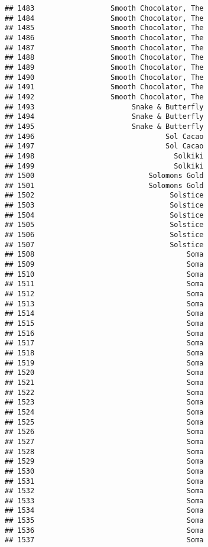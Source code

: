 \documentclass[
]{article}
\begin{document}
\begin{verbatim}
## 1483                  Smooth Chocolator, The
## 1484                  Smooth Chocolator, The
## 1485                  Smooth Chocolator, The
## 1486                  Smooth Chocolator, The
## 1487                  Smooth Chocolator, The
## 1488                  Smooth Chocolator, The
## 1489                  Smooth Chocolator, The
## 1490                  Smooth Chocolator, The
## 1491                  Smooth Chocolator, The
## 1492                  Smooth Chocolator, The
## 1493                       Snake & Butterfly
## 1494                       Snake & Butterfly
## 1495                       Snake & Butterfly
## 1496                               Sol Cacao
## 1497                               Sol Cacao
## 1498                                 Solkiki
## 1499                                 Solkiki
## 1500                           Solomons Gold
## 1501                           Solomons Gold
## 1502                                Solstice
## 1503                                Solstice
## 1504                                Solstice
## 1505                                Solstice
## 1506                                Solstice
## 1507                                Solstice
## 1508                                    Soma
## 1509                                    Soma
## 1510                                    Soma
## 1511                                    Soma
## 1512                                    Soma
## 1513                                    Soma
## 1514                                    Soma
## 1515                                    Soma
## 1516                                    Soma
## 1517                                    Soma
## 1518                                    Soma
## 1519                                    Soma
## 1520                                    Soma
## 1521                                    Soma
## 1522                                    Soma
## 1523                                    Soma
## 1524                                    Soma
## 1525                                    Soma
## 1526                                    Soma
## 1527                                    Soma
## 1528                                    Soma
## 1529                                    Soma
## 1530                                    Soma
## 1531                                    Soma
## 1532                                    Soma
## 1533                                    Soma
## 1534                                    Soma
## 1535                                    Soma
## 1536                                    Soma
## 1537                                    Soma

\end{verbatim}
\end{document}
